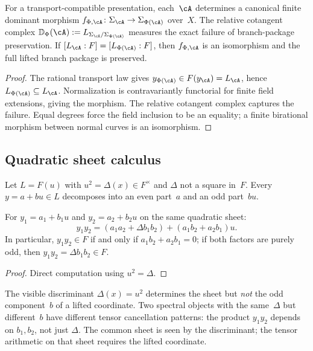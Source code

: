\begin{theorem}
\label{thm:transport-lifted-covers}
For a transport-compatible presentation, each~$\cA$ determines a
canonical finite dominant morphism
$f_{\Phi,\cA} \colon \Sigma_\cA \to \Sigma_{\Phi(\cA)}$
over~$X$.  The relative cotangent complex
$\mathbb{D}_\Phi(\cA)
:= L_{\Sigma_\cA/\Sigma_{\Phi(\cA)}}$
measures the exact failure of branch-package preservation.
If $[L_\cA:F] = [L_{\Phi(\cA)}:F]$, then $f_{\Phi,\cA}$ is an
isomorphism and the full lifted branch package is preserved.
\end{theorem}

\begin{proof}
The rational transport law gives
$y_{\Phi(\cA)} \in F(y_\cA) = L_\cA$, hence
$L_{\Phi(\cA)} \subseteq L_\cA$.  Normalization is
contravariantly functorial for finite field extensions, giving the
morphism.  The relative cotangent complex captures the failure.
Equal degrees force the field inclusion to be an equality; a finite
birational morphism between normal curves is an isomorphism.
\end{proof}

\subsection{Quadratic sheet calculus}
\label{subsec:quadratic-sheet-calculus}

Let $L = F(u)$ with $u^2 = \Delta(x) \in F^\times$ and $\Delta$
not a square in~$F$.  Every $y = a + bu \in L$ decomposes into an
even part~$a$ and an odd part~$bu$.

\begin{theorem}
\label{thm:common-sheet-law}
For $y_1 = a_1 + b_1 u$ and $y_2 = a_2 + b_2 u$ on the same
quadratic sheet:
\[
y_1 y_2 = (a_1 a_2 + \Delta b_1 b_2)
        + (a_1 b_2 + a_2 b_1) u.
\]
In particular, $y_1 y_2 \in F$ if and only if
$a_1 b_2 + a_2 b_1 = 0$; if both factors are purely odd, then
$y_1 y_2 = \Delta b_1 b_2 \in F$.
\end{theorem}

\begin{proof}
Direct computation using $u^2 = \Delta$.
\end{proof}

\begin{remark}
\label{rem:visible-discriminant-misses}
The visible discriminant $\Delta(x) = u^2$ determines the sheet but
\emph{not} the odd component~$b$ of a lifted coordinate.  Two
spectral objects with the same~$\Delta$ but different~$b$
have different tensor cancellation patterns: the product
$y_1 y_2$ depends on $b_1, b_2$, not just $\Delta$.  The common
sheet is seen by the discriminant; the tensor arithmetic on that
sheet requires the lifted coordinate.
\end{remark}


